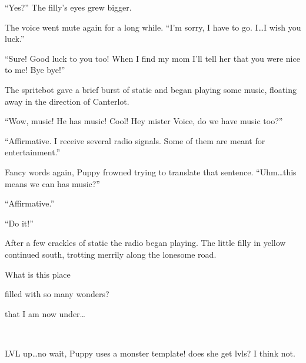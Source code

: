 ``Yes?'' The filly's eyes grew bigger.

The voice went mute again for a long while. ``I'm sorry, I have to go. I\dots I wish you luck.''

``Sure! Good luck to you too! When I find my mom I'll tell her that you were nice to me! Bye bye!''

The spritebot gave a brief burst of static and began playing some music, floating away in the direction of Canterlot.

``Wow, music! He has music! Cool! Hey mister Voice, do we have music too?''

``{\mt Affirmative. I receive several radio signals. Some of them are meant for entertainment.}''

Fancy words again, Puppy frowned trying to translate that sentence. ``Uhm\dots this means we can has music?''

``{\mt Affirmative.}''

``Do it!''

After a few crackles of static the radio began playing. The little filly in yellow continued south, trotting merrily along the lonesome road.

\begin{song}
    What is this place

    filled with so many wonders?

    that I am now under\dots
\end{song}

\clearpage

~\vfill

\begin{engnote}
    LVL up\dots no wait, Puppy uses a monster template! does she get lvls? I think not.
\end{engnote}


